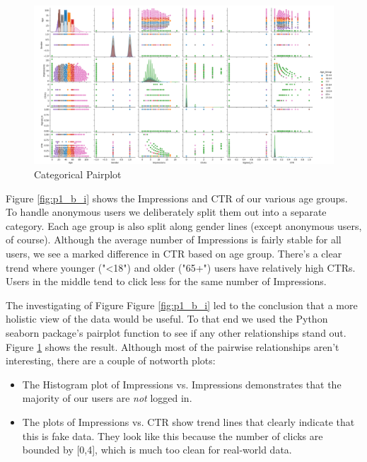 \documentclass[12pt]{article}
\begin{document}
\begin{enumerate}[leftmargin=\labelsep]
  \begin{figure}[htb]
    \begin{center}
      \includegraphics[width=\textwidth]{media/p1_b_iii.png}
    \end{center}
    \caption{Categorical Pairplot}
    \label{fig:p1_b_iii}
  \end{figure}

  Figure \ref{fig:p1_b_i} shows the Impressions and CTR of our various age groups. To handle anonymous users we deliberately
  split them out into a separate category. Each age group is also split along gender lines (except anonymous users, of course).
  Although the average number of Impressions is fairly stable for all users, we see a marked difference in CTR based on age
  group. There's a clear trend where younger ("<18") and older ("65+") users have relatively high CTRs. Users in the middle
  tend to click less for the same number of Impressions.

  The investigating of Figure Figure \ref{fig:p1_b_i} led to the conclusion that a more holistic view of the data would be useful.
  To that end we used the Python seaborn package's pairplot function to see if any other relationships stand out. Figure \ref{fig:p1_b_iii}
  shows the result. Although most of the pairwise relationships aren't interesting, there are a couple of notworth plots:
  \begin{itemize}
    \item The Histogram plot of Impressions vs. Impressions demonstrates that the majority of our users are \textit{not} logged in.
    \item The plots of Impressions vs. CTR show trend lines that clearly indicate that this is fake data. They look like this because
      the number of clicks are bounded by [0,4], which is much too clean for real-world data.
  \end{itemize}


\end{enumerate}
\end{document}
